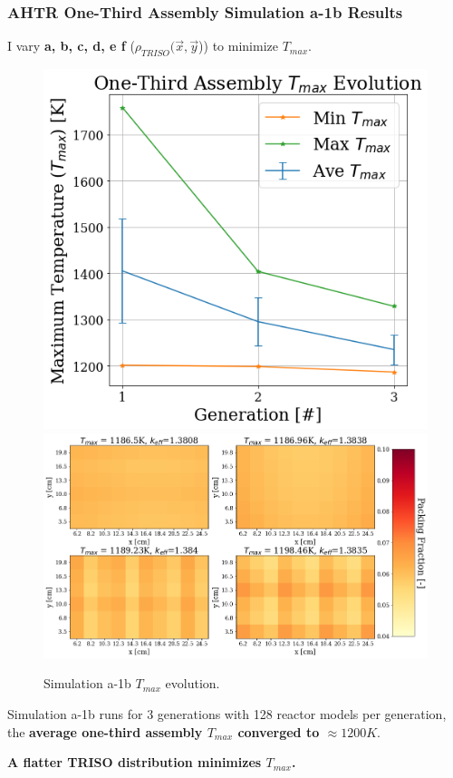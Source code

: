 \begin{frame}
    \frametitle{AHTR One-Third Assembly Simulation a-1b Results}
    I vary \textbf{a, b, c, d, e f} ($\rho_{TRISO}(\vec{x}, \vec{y}$))
    to minimize $T_{max}$. 

    \begin{figure}
        \includegraphics[width=0.39\linewidth]{figures/assem-obj-1-temp-evol-pres.png} 
        \includegraphics[width=0.59\linewidth]{../docs/figures/assem-obj-1-temp-final.png}
        \caption{Simulation a-1b $T_{max}$ evolution.}
    \end{figure}

    Simulation a-1b runs for 3 generations with 128 reactor models per generation, the 
    \textbf{average one-third assembly $T_{max}$ converged to  $\approx 1200K$}.

    \begin{tcolorbox}[colback=illiniorange,colframe=illiniorange!50!black]
        \textbf{A flatter TRISO distribution minimizes $T_{max}$.}
    \end{tcolorbox}
\end{frame}

